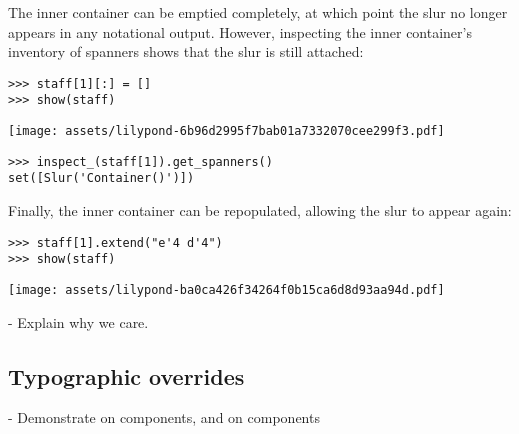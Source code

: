 \noindent The inner container can be emptied completely, at which point the
slur no longer appears in any notational output. However, inspecting the inner
container's inventory of spanners shows that the slur is still attached:

\begin{comment}
<abjad>
staff[1][:] = []
show(staff)
inspect_(staff[1]).get_spanners()
</abjad>
\end{comment}

\begin{abjadbookoutput}
\begin{singlespacing}
\vspace{-0.5\baselineskip}
\begin{lstlisting}
>>> staff[1][:] = []
>>> show(staff)
\end{lstlisting}
\noindent\texttt{[image: assets/lilypond-6b96d2995f7bab01a7332070cee299f3.pdf]}
\begin{lstlisting}
>>> inspect_(staff[1]).get_spanners()
set([Slur('Container()')])
\end{lstlisting}
\end{singlespacing}
\end{abjadbookoutput}

\noindent Finally, the inner container can be repopulated, allowing the slur to
appear again:

\begin{comment}
<abjad>
staff[1].extend("e'4 d'4")
show(staff)
</abjad>
\end{comment}

\begin{abjadbookoutput}
\begin{singlespacing}
\vspace{-0.5\baselineskip}
\begin{lstlisting}
>>> staff[1].extend("e'4 d'4")
>>> show(staff)
\end{lstlisting}
\noindent\texttt{[image: assets/lilypond-ba0ca426f34264f0b15ca6d8d93aa94d.pdf]}
\end{singlespacing}
\end{abjadbookoutput}

-   Explain why we care.

\subsection{Typographic overrides}
\label{ssec:typographic-overrides}

-   Demonstrate on components, and on components

